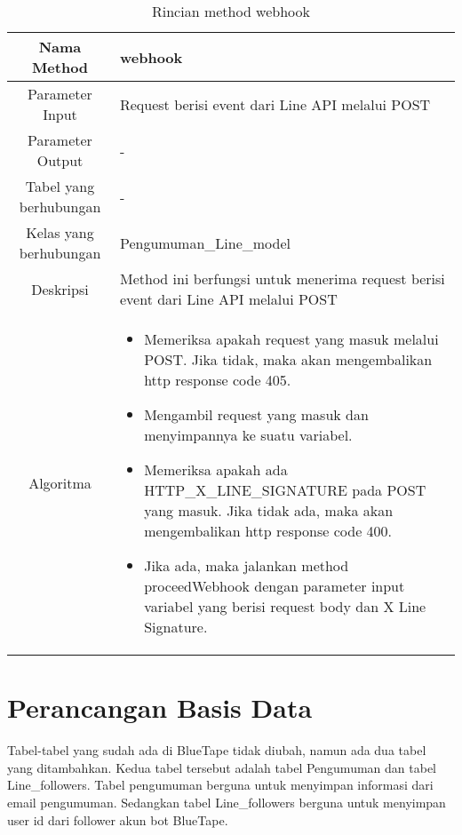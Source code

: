 \begin{center}
	\begin{table}[H]
	\caption{Rincian method webhook}
	\label{table:pengumumanline-webhook}
\begin{tabular}{|c|p{11cm}|}
\hline
Nama Method 	& 	 webhook	\\
\hline
Parameter Input & Request berisi event dari Line API melalui POST \\
\hline
Parameter Output & - \\
\hline
Tabel yang berhubungan & -\\
\hline
Kelas yang berhubungan & Pengumuman\_Line\_model \\
\hline
Deskripsi	& Method ini berfungsi untuk menerima request berisi event dari Line API melalui POST\\
\hline
Algoritma	& \begin{itemize}
				\item Memeriksa apakah request yang masuk melalui POST. Jika tidak, maka akan mengembalikan http response code 405.
				\item Mengambil request yang masuk dan menyimpannya ke suatu variabel.
				\item Memeriksa apakah ada HTTP\_X\_LINE\_SIGNATURE pada POST yang masuk. Jika tidak ada, maka akan mengembalikan http response code 400.
				\item Jika ada, maka jalankan method proceedWebhook dengan parameter input variabel yang berisi request body dan X Line Signature.
				\end{itemize} \\
\hline
\end{tabular}
\end{table}
\end{center}

\section{Perancangan Basis Data}
Tabel-tabel yang sudah ada di BlueTape tidak diubah, namun ada dua tabel yang ditambahkan. Kedua tabel tersebut adalah tabel Pengumuman dan tabel Line\_followers. Tabel pengumuman berguna untuk menyimpan informasi dari email pengumuman. Sedangkan tabel Line\_followers berguna untuk menyimpan user id dari follower akun bot BlueTape.

